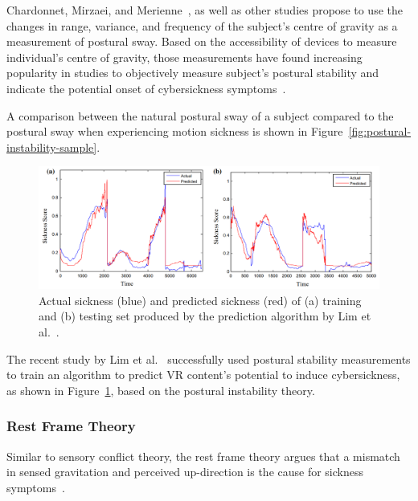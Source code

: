 Chardonnet, Mirzaei, and Merienne~\cite{Chardonnet2015}, as well as other studies propose to use the changes in 
range, variance, and frequency of the subject's centre of gravity as a measurement of postural sway.
Based on the accessibility of devices to measure individual's centre of gravity, those measurements have found
increasing popularity in studies to objectively measure subject's postural stability and indicate the potential onset
of cybersickness symptoms~\cite{Lim2020}.

A comparison between the natural postural sway of a subject compared to the postural sway when experiencing motion
sickness is shown in Figure~\ref{fig:postural-instability-sample}.

\begin{figure}[h]
    \centering
    \includegraphics[width=\textwidth]{content/2_2_cybersickness/img/PosturalStabilitySicknessPrediction[Lim2020]}
    \caption{Actual sickness (blue) and predicted sickness (red) of (a) training and (b) testing set produced by the
    prediction algorithm by Lim et al.~\cite{Lim2020}.}
    \label{fig:sickness-prediction-algorithm}
\end{figure}

The recent study by Lim et al.~\cite{Lim2020} successfully used postural stability measurements to train an algorithm
to predict VR content's potential to induce cybersickness, as shown in Figure~\ref{fig:sickness-prediction-algorithm},
based on the postural instability theory.


\subsubsection{Rest Frame Theory}\label{subsubsec:rest-frame-theory}

Similar to sensory conflict theory, the rest frame theory argues that a mismatch in sensed gravitation and perceived
up-direction is the cause for sickness symptoms~\cite{Rebenitsch2016}.

